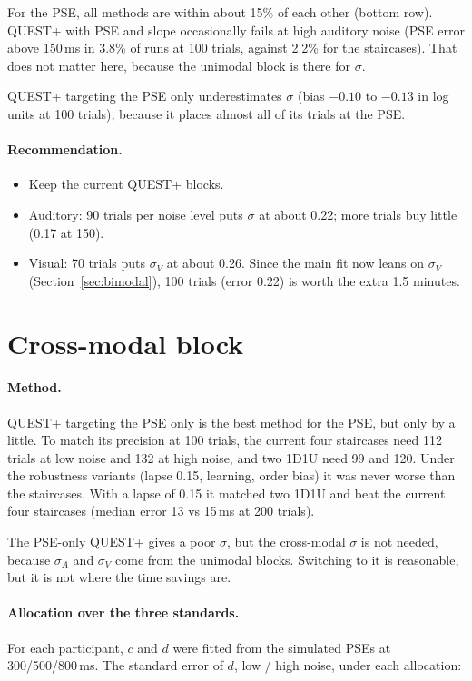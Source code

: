 \documentclass[11pt,a4paper]{article}
\begin{document}
For the PSE, all methods are within about 15\% of each other (bottom row). QUEST+ with PSE and slope occasionally fails at high auditory noise (PSE error above 150\,ms in 3.8\% of runs at 100 trials, against 2.2\% for the staircases). That does not matter here, because the unimodal block is there for $\sigma$.

QUEST+ targeting the PSE only underestimates $\sigma$ (bias $-0.10$ to $-0.13$ in log units at 100 trials), because it places almost all of its trials at the PSE.

\paragraph{Recommendation.}
\begin{itemize}
\item Keep the current QUEST+ blocks.
\item Auditory: 90 trials per noise level puts $\sigma$ at about 0.22; more trials buy little (0.17 at 150).
\item Visual: 70 trials puts $\sigma_V$ at about 0.26. Since the main fit now leans on $\sigma_V$ (Section~\ref{sec:bimodal}), 100 trials (error 0.22) is worth the extra 1.5 minutes.
\end{itemize}

\section{Cross-modal block}
\paragraph{Method.} QUEST+ targeting the PSE only is the best method for the PSE, but only by a little. To match its precision at 100 trials, the current four staircases need 112 trials at low noise and 132 at high noise, and two 1D1U need 99 and 120. Under the robustness variants (lapse 0.15, learning, order bias) it was never worse than the staircases. With a lapse of 0.15 it matched two 1D1U and beat the current four staircases (median error 13 vs 15\,ms at 200 trials).

The PSE-only QUEST+ gives a poor $\sigma$, but the cross-modal $\sigma$ is not needed, because $\sigma_A$ and $\sigma_V$ come from the unimodal blocks. Switching to it is reasonable, but it is not where the time savings are.

\paragraph{Allocation over the three standards.} For each participant, $c$ and $d$ were fitted from the simulated PSEs at 300/500/800\,ms. The standard error of $d$, low / high noise, under each allocation:
\end{document}
